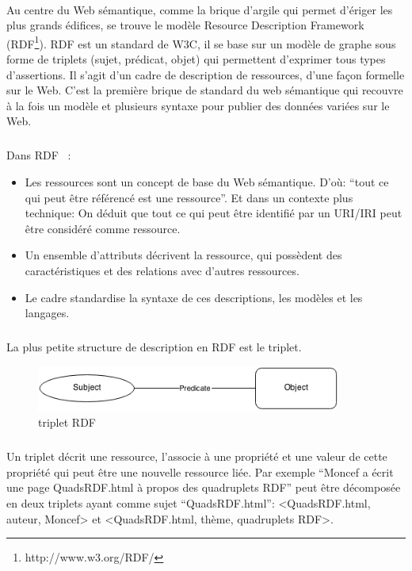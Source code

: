 \documentclass[12pt,a4	]{report}
\begin{document}
\paragraph{}
Au centre du Web sémantique, comme la brique d’argile qui permet d’ériger les plus grands édifices, se trouve le modèle Resource Description Framework (RDF\footnote{http://www.w3.org/RDF/}). RDF est un standard de W3C, il se base sur un modèle de graphe sous forme de triplets (sujet, prédicat, objet) qui permettent d'exprimer tous types d'assertions. Il s’agit d’un cadre de description de ressources, d’une façon formelle sur le Web.
C’est la première brique de standard du web sémantique qui recouvre à la fois un modèle et plusieurs syntaxe pour publier des données variées sur le Web.
\subparagraph{}
Dans RDF ~: 
\newline 
\begin{itemize}
\item Les ressources sont un concept de base du Web sémantique. D’où:  “tout ce qui peut être référencé est une ressource”. Et dans un contexte plus technique: On déduit que tout ce qui peut être identifié par un URI/IRI peut être considéré comme ressource.
\item  Un ensemble d’attributs décrivent la ressource, qui possèdent des caractéristiques et des relations avec d’autres ressources.
\item Le cadre standardise la syntaxe de ces descriptions, les modèles et les langages.  
\end{itemize}
\subparagraph{}
La plus petite structure de description en RDF est le triplet.
\begin{figure}[H]
        \centering
                \centering
                \includegraphics[width=10cm]{tripletrdf.png}
               \caption{triplet RDF}

\end{figure}
\subparagraph{}
Un triplet décrit une ressource, l’associe à une propriété et une valeur de cette propriété qui peut être une nouvelle ressource liée.
\newline
Par exemple “Moncef a écrit une page QuadsRDF.html à propos des quadruplets RDF” peut être décomposée en deux triplets ayant comme sujet “QuadsRDF.html”: <QuadsRDF.html, auteur, Moncef> et <QuadsRDF.html, thème, quadruplets RDF>.
\newline
\end{document}

